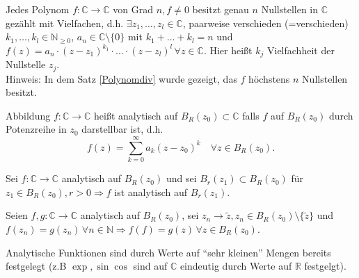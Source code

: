 \begin{conclusion}
    Jedes Polynom $f: \mathbb{C} \to \mathbb{C}$ von Grad $n, f\neq 0$ besitzt genau $n$ Nullstellen in $\mathbb{C}$ gezählt mit Vielfachen, d.h. $\exists z_1,\dots,z_l \in \mathbb{C}$, paarweise verschieden (=verschieden) $k_1,\dots, k_l \in \mathbb{N}_{\geq 0}$, $a_n \in \mathbb{C}\setminus\{0\}$ mit $k_1 + \dots + k_l = n$ und $f(z) = a_n \cdot (z-z_1)^{k_1}\cdot\dots\cdot(z-z_l)^{l}\,\forall z \in \mathbb{C}$. Hier heißt $k_j$ Vielfachheit der Nullstelle $z_j$.\\
    Hinweis: In dem Satz \ref{Polynomdiv} wurde gezeigt, das $f$ höchstens $n$ Nullstellen besitzt.
\end{conclusion}

\begin{definition}
    Abbildung $f:\mathbb{C} \to \mathbb{C}$ heißt analytisch auf $B_R(z_0)\subset \mathbb{C}$ falls $f$ auf $B_R(z_0)$ durch Potenzreihe in $z_0$ darstellbar ist, d.h.
    \[
    f(z)=\sum_{k=0}^{\infty} a_k(z-z_0)^k \quad \forall z \in B_R(z_0).
    \]
\end{definition}

\begin{proposition}
    Sei $f:\mathbb{C}\to\mathbb{C}$ analytisch auf $B_R(z_0)$ und sei $B_r(z_1) \subset B_R(z_0)$ für $z_1 \in B_R(z_0),r>0 \Rightarrow f$ ist analytisch auf $B_r(z_1)$.
\end{proposition}

\begin{proposition}
    Seien $f,g:\mathbb{C} \to \mathbb{C}$ analytisch auf $B_R(z_0)$, sei $z_n \to \tilde{z},z_n\in B_R(z_0)\setminus\{\tilde{z}\}$ und $f(z_n) = g(z_n)\,\forall n \in \mathbb{N} \Rightarrow f(f) = g(z)\,\forall z \in B_R(z_0)$.
\end{proposition}

\begin{remark}
    Analytische Funktionen sind durch Werte auf "`sehr kleinen"' Mengen bereits festgelegt (z.B $\exp,\sin\cos$ sind auf $\mathbb{C}$ eindeutig durch Werte auf $\mathbb{R}$ festgelgt).
\end{remark}

